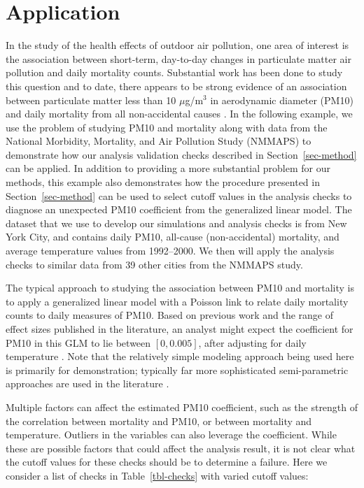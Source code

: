\documentclass[
  12pt,
]{interact}
\begin{document}
\section{Application}\label{sec-pm10-mortality}

In the study of the health effects of outdoor air pollution, one area of
interest is the association between short-term, day-to-day changes in
particulate matter air pollution and daily mortality counts. Substantial
work has been done to study this question and to date, there appears to
be strong evidence of an association between particulate matter less
than 10 \(\mu\)g/m\(^3\) in aerodynamic diameter (PM10) and daily
mortality from all non-accidental causes \citep{samet2000fine}. In the
following example, we use the problem of studying PM10 and mortality
along with data from the National Morbidity, Mortality, and Air
Pollution Study (NMMAPS) to demonstrate how our analysis validation
checks described in Section~\ref{sec-method} can be applied. In addition
to providing a more substantial problem for our methods, this example
also demonstrates how the procedure presented in
Section~\ref{sec-method} can be used to select cutoff values in the
analysis checks to diagnose an unexpected PM10 coefficient from the
generalized linear model. The dataset that we use to develop our
simulations and analysis checks is from New York City, and contains
daily PM10, all-cause (non-accidental) mortality, and average
temperature values from 1992--2000. We then will apply the analysis
checks to similar data from 39 other cities from the NMMAPS study.

The typical approach to studying the association between PM10 and
mortality is to apply a generalized linear model with a Poisson link to
relate daily mortality counts to daily measures of PM10. Based on
previous work and the range of effect sizes published in the literature,
an analyst might expect the coefficient for PM10 in this GLM to lie
between \([0, 0.005]\), after adjusting for daily temperature
\citep{samet2000fine, welty2005acute}. Note that the relatively simple
modeling approach being used here is primarily for demonstration;
typically far more sophisticated semi-parametric approaches are used in
the literature \citep{peng2006model}.

Multiple factors can affect the estimated PM10 coefficient, such as the
strength of the correlation between mortality and PM10, or between
mortality and temperature. Outliers in the variables can also leverage
the coefficient. While these are possible factors that could affect the
analysis result, it is not clear what the cutoff values for these checks
should be to determine a failure. Here we consider a list of checks in
Table~\ref{tbl-checks} with varied cutoff values:
\end{document}
